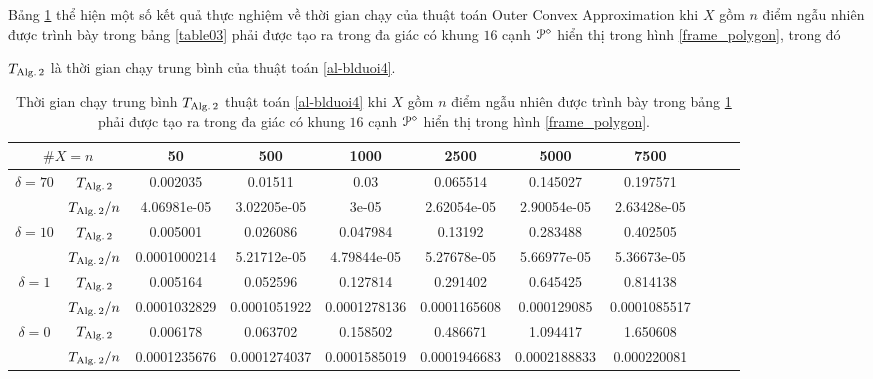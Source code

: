 \documentclass[12pt,a4paper,openany,oneside]{report}
\begin{document}
\medskip
Bảng \ref{table04}  thể hiện một số kết quả thực nghiệm về thời gian chạy của thuật toán Outer Convex Approximation khi $X$ gồm $n$ điểm ngẫu nhiên được trình bày trong bảng \ref{table03} phải được tạo ra trong đa giác có khung $16$ cạnh ${\cal P}^\diamond$ hiển thị trong hình \ref{frame_polygon}, trong đó

$T_{\rm Alg.\, 2}$ là thời gian chạy trung bình của thuật toán \ref{al-blduoi4}.

\begin{table}[ht]
	\begin{center}\renewcommand{\arraystretch}{1.2}\small
		\setlength\tabcolsep{0.05cm}
		\begin{tabular}{|c|c||c|c|c|c|c|c|c|c|c|}
			\hline
			\multicolumn {2}{|c||}{\footnotesize $\#X=n$} &50& 500& 1000& 2500& 5000& 7500\\ 
			\hline		
			\hline
			{ $\delta = 70$}
			
			& $T_{\rm Alg.\, 2}$  &0.002035 & 0.01511 & 0.03 & 0.065514 & 0.145027 & 0.197571 \\
			
			& $T_{\rm Alg.\, 2}/n$&4.06981e-05 & 3.02205e-05 & 3e-05 & 2.62054e-05 & 2.90054e-05 & 2.63428e-05 \\
			\hline
			{ $\delta = 10$}
			
			& $T_{\rm Alg.\, 2}$  &0.005001 & 0.026086 & 0.047984 & 0.13192 & 0.283488 & 0.402505 \\
			
			& $T_{\rm Alg.\, 2}/n$&0.0001000214 & 5.21712e-05 & 4.79844e-05 & 5.27678e-05 & 5.66977e-05 & 5.36673e-05 \\
			\hline
			{ $\delta = 1$}
			
			& $T_{\rm Alg.\, 2}$  &0.005164 & 0.052596 & 0.127814 & 0.291402 & 0.645425 & 0.814138\\
			
			& $T_{\rm Alg.\, 2}/n$&0.0001032829 & 0.0001051922 & 0.0001278136 & 0.0001165608 & 0.000129085 & 0.0001085517\\
			\hline
			{ $\delta = 0$}
			
			& $T_{\rm Alg.\, 2}$  &0.006178 & 0.063702 & 0.158502 & 0.486671 & 1.094417 & 1.650608 \\
			
			& $T_{\rm Alg.\, 2}/n$&0.0001235676 & 0.0001274037 & 0.0001585019 & 0.0001946683 & 0.0002188833 & 0.000220081\\
			\hline
		\end{tabular}
		\caption{Thời gian chạy trung bình $T_{\rm Alg.\,2}$  thuật toán \ref{al-blduoi4} khi $X$ gồm $n$ điểm ngẫu nhiên được trình bày trong bảng \ref{table04} phải được tạo ra trong đa giác có khung $16$ cạnh  ${\cal P}^\diamond$ hiển thị trong hình \ref{frame_polygon}.}
		\label{table04}
	\end{center}
\end{table} 	
\end{document}
